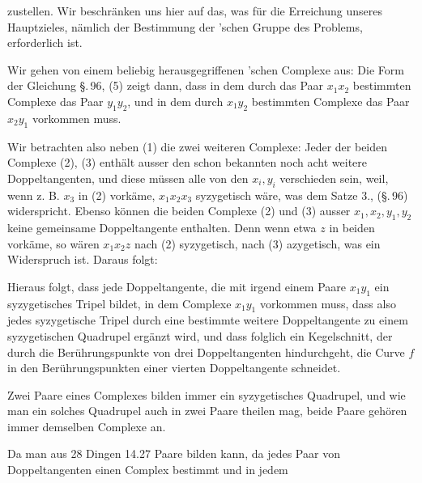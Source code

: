 zustellen. Wir beschränken uns hier auf das, was für die Erreichung unseres Hauptzieles, nämlich der Bestimmung der 'schen Gruppe des Problems, erforderlich ist.

Wir gehen von einem beliebig herausgegriffenen 'schen Complexe aus:
Die Form der Gleichung \S.\,96, (5) zeigt dann, dass in dem durch das Paar $x_1 x_2$ bestimmten Complexe das Paar $y_1 y_2$, und in dem durch $x_1 y_2$ bestimmten Complexe das Paar $x_2 y_1$ vorkommen muss.

Wir betrachten also neben (1) die zwei weiteren Complexe:
Jeder der beiden Complexe (2), (3) enthält ausser den schon bekannten noch acht weitere Doppeltangenten, und diese müssen alle von den $x_i, y_i$ verschieden sein, weil, wenn z. B. $x_3$ in (2) vorkäme, $x_1 x_2 x_3$ syzygetisch wäre, was dem Satze 3., (\S.\,96) widerspricht. Ebenso können die beiden Complexe (2) und (3) ausser $x_1, x_2, y_1, y_2$ keine gemeinsame Doppeltangente enthalten. Denn wenn etwa $z$ in beiden vorkäme, so wären $x_1 x_2 z$ nach (2) syzygetisch, nach (3) azygetisch, was ein Widerspruch ist. Daraus folgt:


Hieraus folgt, dass jede Doppeltangente, die mit irgend einem Paare $x_1 y_1$ ein syzygetisches Tripel bildet, in dem Complexe $x_1 y_1$ vorkommen muss, dass also jedes syzygetische Tripel durch eine bestimmte weitere Doppeltangente zu einem syzygetischen Quadrupel ergänzt wird, und dass folglich ein Kegelschnitt, der durch die Berührungspunkte von drei Doppeltangenten hindurchgeht, die Curve $f$ in den Berührungspunkten einer vierten Doppeltangente schneidet.

Zwei Paare eines Complexes bilden immer ein syzygetisches Quadrupel, und wie man ein solches Quadrupel auch in zwei Paare theilen mag, beide Paare gehören immer demselben Complexe an.

Da man aus 28 Dingen 14.27 Paare bilden kann, da jedes Paar von Doppeltangenten einen Complex bestimmt und in jedem
